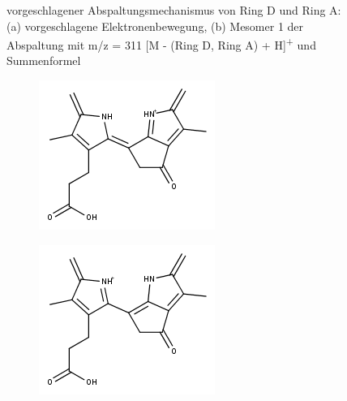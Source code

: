 \begin{figure}[!htbp]
\begin{subfigure}[b]{0.5\textwidth}
    \caption{}
    \label{fig:311MHMesomer1}
  \end{subfigure}
  \caption[Abspaltungsmechanismus von Ring D und Ring A und Mesomer 1, Quelle: Autor]{vorgeschlagener Abspaltungsmechanismus von Ring D und Ring A: (a) vorgeschlagene Elektronenbewegung, (b) Mesomer 1 der Abspaltung mit m/z = 311 [M - (Ring D, Ring A) + H]\textsuperscript{+} und Summenformel }
\end{figure}

\begin{figure}[!htbp]
  \begin{subfigure}[b]{0.5\textwidth}
    \includegraphics[width=\textwidth]{figures/Kapitel7/Kataboliten/fragmentation_structures/VWA_Katabolit_619-CO2-RingD-RingA_311_Mesomer1.png}
    \caption{}
    \label{fig:311MHMesomer2}
  \end{subfigure}
  \hfill
  \begin{subfigure}[b]{0.5\textwidth}
    \includegraphics[width=\textwidth]{figures/Kapitel7/Kataboliten/fragmentation_structures/VWA_Katabolit_619-CO2-RingD-RingA_311_Mesomer2.png}

\end{subfigure}
\end{figure}
